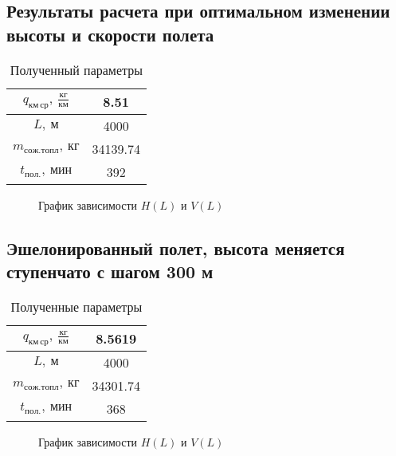 \documentclass[bachelor,subf,14pt, substylefile = spbu.rtx]{disser}
\begin{document}
\subsection{Результаты расчета при оптимальном изменении высоты и скорости полета}

\begin{table}[H]
    \centering
    \caption{Полученный параметры}
    \label{tab:H_opt_V_opt}
    \begin{tabular}{|c|c|}
        \hline
        $q_{км\, ср},\ \frac{кг}{км}$ & 8.51 \\
        \hline
        $L,\ м$ & 4000 \\
        \hline
        $m_{сож.топл},\ кг$ & 34139.74\\
        \hline
        $t_{пол.},\ мин$ & 392 \\
        \hline
    \end{tabular}
\end{table}

\begin{figure}[H]
\centering

\caption{График зависимости $H(L)$ и $V(L)$}
\label{fig:H_vat_optimal}
\end{figure}


\subsection{Эшелонированный полет, высота меняется ступенчато с шагом 300 м}

\begin{table}[H]
    \centering
    \caption{Полученные параметры}
    \label{tab:H_300_V_opt}
    \begin{tabular}{|c|c|}
        \hline
        $q_{км\, ср},\ \frac{кг}{км}$ & 8.5619 \\
        \hline
        $L,\ м$ & 4000 \\
        \hline
        $m_{сож.топл},\ кг$ & 34301.74\\
        \hline
        $t_{пол.},\ мин$ & 368 \\
        \hline
    \end{tabular}
\end{table}


\begin{figure}[H]
\centering

\caption{График зависимости $H(L)$ и $V(L)$}
\label{fig:FL_H_V_opt}
\end{figure}


\begin{table}[H]
\centering
\resizebox{\textwidth-1.4cm}{!}{
    
}
\caption{$q_{km}\, [\frac{кг}{км}], V \, [\frac{м}{с}] $}
\label{t:1}
\end{table}
\end{document}
